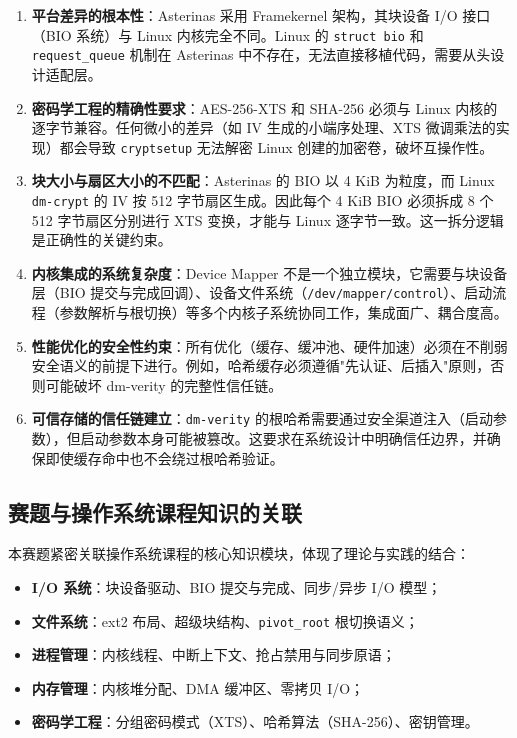 \begin{enumerate}
    \item \textbf{平台差异的根本性}：Asterinas 采用 Framekernel 架构，其块设备 I/O 接口（BIO 系统）与 Linux 内核完全不同。Linux 的 \texttt{struct bio} 和 \texttt{request\_queue} 机制在 Asterinas 中不存在，无法直接移植代码，需要从头设计适配层。
    
    \item \textbf{密码学工程的精确性要求}：AES-256-XTS 和 SHA-256 必须与 Linux 内核的 \texttt{} 逐字节兼容。任何微小的差异（如 IV 生成的小端序处理、XTS 微调乘法的实现）都会导致 \texttt{cryptsetup} 无法解密 Linux 创建的加密卷，破坏互操作性。
    
    \item \textbf{块大小与扇区大小的不匹配}：Asterinas 的 BIO 以 4 KiB 为粒度，而 Linux \texttt{dm-crypt} 的 IV 按 512 字节扇区生成。因此每个 4 KiB BIO 必须拆成 8 个 512 字节扇区分别进行 XTS 变换，才能与 Linux 逐字节一致。这一拆分逻辑是正确性的关键约束。
    
    \item \textbf{内核集成的系统复杂度}：Device Mapper 不是一个独立模块，它需要与块设备层（BIO 提交与完成回调）、设备文件系统（\texttt{/dev/mapper/control}）、启动流程（参数解析与根切换）等多个内核子系统协同工作，集成面广、耦合度高。
    
    \item \textbf{性能优化的安全性约束}：所有优化（缓存、缓冲池、硬件加速）必须在不削弱安全语义的前提下进行。例如，哈希缓存必须遵循"先认证、后插入"原则，否则可能破坏 dm-verity 的完整性信任链。
    
    \item \textbf{可信存储的信任链建立}：\texttt{dm-verity} 的根哈希需要通过安全渠道注入（启动参数），但启动参数本身可能被篡改。这要求在系统设计中明确信任边界，并确保即使缓存命中也不会绕过根哈希验证。
\end{enumerate}

\subsection{赛题与操作系统课程知识的关联}

本赛题紧密关联操作系统课程的核心知识模块，体现了理论与实践的结合：

\begin{itemize}
    \item \textbf{I/O 系统}：块设备驱动、BIO 提交与完成、同步/异步 I/O 模型；
    \item \textbf{文件系统}：ext2 布局、超级块结构、\texttt{pivot\_root} 根切换语义；
    \item \textbf{进程管理}：内核线程、中断上下文、抢占禁用与同步原语；
    \item \textbf{内存管理}：内核堆分配、DMA 缓冲区、零拷贝 I/O；
    \item \textbf{密码学工程}：分组密码模式（XTS）、哈希算法（SHA-256）、密钥管理。
\end{itemize}

